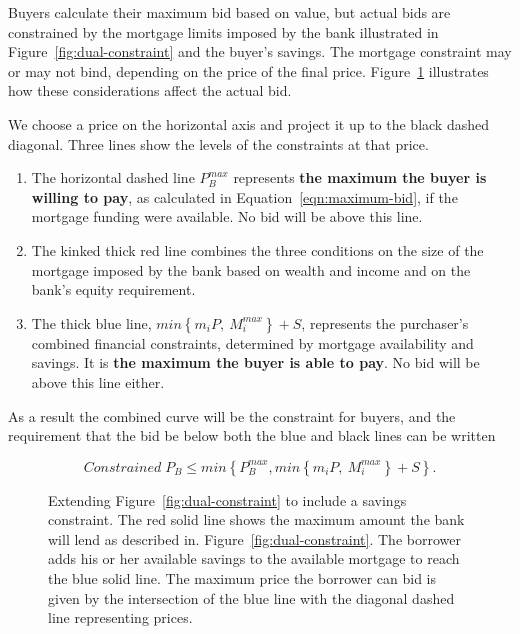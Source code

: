 Buyers calculate their maximum bid based on value, but actual bids are constrained by the mortgage limits imposed by the bank illustrated in Figure~\ref{fig:dual-constraint} and the buyer's savings. The mortgage constraint may or may not bind, depending on the price of the final price. Figure~\ref{fig:savings-constraint} illustrates how these considerations affect the actual bid. 

We choose a price on the horizontal axis and project it up to the black dashed diagonal. Three lines show the levels of the constraints at that price.
\begin{enumerate}
    \item The horizontal dashed line $P_B^{max}$ represents \textbf{the maximum the buyer is willing to pay}, as calculated in Equation~\ref{eqn:maximum-bid}, if the mortgage funding were available. No bid will be above this line. 

    \item The kinked thick red line combines the three conditions on the size of the mortgage imposed by the bank based on wealth and income and on the bank's equity requirement.
   
    \item The thick blue line, $min\left\{m_i P,\  M_{i}^{max}\right\}+ S $, represents the purchaser's combined financial constraints, determined by mortgage availability and savings. It is \textbf{the maximum the buyer is able to pay}.  No bid will be above this line either.
\end{enumerate}
 As a result the combined curve will be the constraint for buyers, and the requirement that the bid be below both the blue and black lines can be written

\begin{equation}
    Constrained\; P_{B} \le min \left\{P^{max}_B, min\left\{m_i P,\  M_{i}^{max}\right\}+ S \right\}.  \label{eqn:bid_diagonal}
\end{equation}




 \begin{figure}
    \centering
    
    \caption[Incorporating a savings constraint]{Extending Figure~\ref{fig:dual-constraint} to include a savings constraint.  The red solid line shows the maximum amount the bank will lend as described in. Figure~\ref{fig:dual-constraint}. The borrower adds his or her available savings to the available mortgage to reach the blue solid line.  The maximum price the borrower can bid is given by the intersection of the blue line with the diagonal dashed line representing prices.}
    \label{fig:savings-constraint}
    \end{figure}

